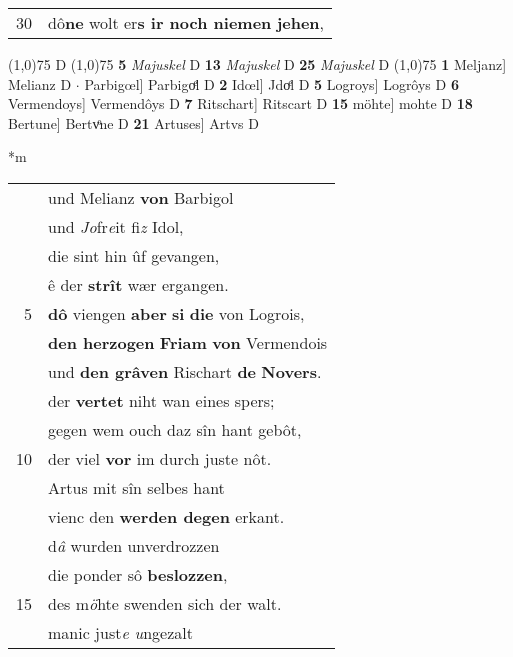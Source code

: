\documentclass[8pt,a4paper,notitlepage]{article}
\begin{document}
\begin{table}[ht]
\begin{minipage}[t]{0.5\linewidth}
\begin{tabular}{rl}
30 & dô\textbf{ne} wolt er\textbf{s ir noch niemen} \textbf{jehen},\\ 
\end{tabular}
\scriptsize
\line(1,0){75} \newline
D \newline
\line(1,0){75} \newline
\textbf{5} \textit{Majuskel} D  \textbf{13} \textit{Majuskel} D  \textbf{25} \textit{Majuskel} D  \newline
\line(1,0){75} \newline
\textbf{1} Meljanz] Melianz D  $\cdot$ Parbigœl] Parbigoͤl D \textbf{2} Idœl] Jdoͤl D \textbf{5} Logroys] Logrôys D \textbf{6} Vermendoys] Vermendôys D \textbf{7} Ritschart] Ritscart D \textbf{15} möhte] mohte D \textbf{18} Bertune] Bertvͦne D \textbf{21} Artuses] Artvs D \newline
\end{minipage}
\hspace{0.5cm}
\begin{minipage}[t]{0.5\linewidth}
\small
\begin{center}*m
\end{center}
\begin{tabular}{rl}
 & und Melianz \textbf{von} Barbigol\\ 
 & und \textit{Jo}fr\textit{e}it fi\textit{z} Idol,\\ 
 & die sint hin ûf gevangen,\\ 
 & ê der \textbf{strît} wær ergangen.\\ 
5 & \textbf{dô} viengen \textbf{aber} \textbf{si} \textbf{die} von Logrois,\\ 
 & \textbf{den herzogen} \textbf{Friam} \textbf{von} Vermendois\\ 
 & und \textbf{den grâven} Rischart \textbf{de} \textbf{Novers}.\\ 
 & der \textbf{vertet} niht wan eines spers;\\ 
 & gegen wem ouch daz sîn hant gebôt,\\ 
10 & der viel \textbf{vor} im durch juste nôt.\\ 
 & Artus mit sîn selbes hant\\ 
 & vienc den \textbf{werden degen} erkant.\\ 
 & d\textit{â} wurden unverdrozzen\\ 
 & die ponder sô \textbf{beslozzen},\\ 
15 & des m\textit{ö}hte swenden sich der walt.\\ 
 & manic just\textit{e u}ngezalt\\ 

\end{tabular}
\end{minipage}
\end{table}
\end{document}
